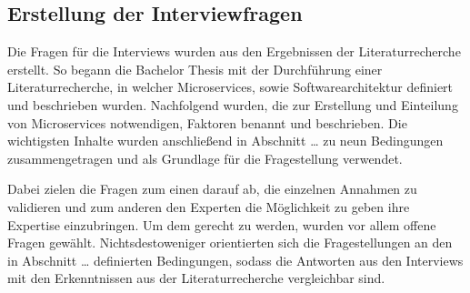 \subsection{Erstellung der Interviewfragen}

Die Fragen für die Interviews wurden aus den Ergebnissen der Literaturrecherche erstellt. So begann die Bachelor Thesis mit der Durchführung einer Literaturrecherche, in welcher Microservices, sowie Softwarearchitektur definiert und beschrieben wurden. Nachfolgend wurden, die zur Erstellung und Einteilung von Microservices notwendigen, Faktoren benannt und beschrieben.  Die wichtigsten Inhalte wurden anschließend in Abschnitt … zu neun Bedingungen zusammengetragen und als Grundlage für die Fragestellung verwendet.

Dabei zielen die Fragen zum einen darauf ab, die einzelnen Annahmen zu validieren und zum anderen den Experten die Möglichkeit zu geben ihre Expertise einzubringen. Um dem gerecht zu werden, wurden vor allem offene Fragen gewählt. Nichtsdestoweniger orientierten sich die Fragestellungen an den in Abschnitt … definierten Bedingungen, sodass die Antworten aus den Interviews mit den Erkenntnissen aus der Literaturrecherche vergleichbar sind.